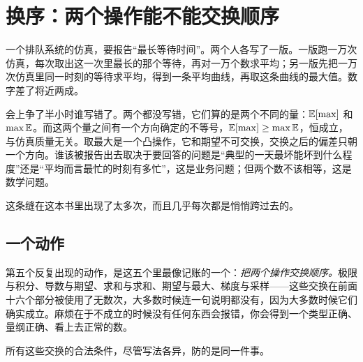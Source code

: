 \section{换序：两个操作能不能交换顺序}
\label{sec:18-Synthesis/02-Recurring-Ideas/05}

一个排队系统的仿真，要报告``最长等待时间''。两个人各写了一版。一版跑一万次仿真，每次取出这一次里最长的那个等待，再对一万个数求平均；另一版先把一万次仿真里同一时刻的等待求平均，得到一条平均曲线，再取这条曲线的最大值。数字差了将近两成。

会上争了半小时谁写错了。两个都没写错，它们算的是两个不同的量：\(\mathbb{E}[\max]\) 和 \(\max \mathbb{E}\)。而这两个量之间有一个方向确定的不等号，\(\mathbb{E}[\max]\ge\max\mathbb{E}\)，恒成立，与仿真质量无关。取最大是一个凸操作，它和期望不可交换，交换之后的偏差只朝一个方向。谁该被报告出去取决于要回答的问题是``典型的一天最坏能坏到什么程度''还是``平均而言最忙的时刻有多忙''，这是业务问题；但两个数不该相等，这是数学问题。

这条缝在这本书里出现了太多次，而且几乎每次都是悄悄跨过去的。

\subsection{一个动作}

第五个反复出现的动作，是这五个里最像记账的一个：\emph{把两个操作交换顺序。}极限与积分、导数与期望、求和与求和、期望与最大、梯度与采样——这些交换在前面十六个部分被使用了无数次，大多数时候连一句说明都没有，因为大多数时候它们确实成立。麻烦在于不成立的时候没有任何东西会报错，你会得到一个类型正确、量纲正确、看上去正常的数。

所有这些交换的合法条件，尽管写法各异，防的是同一件事。

